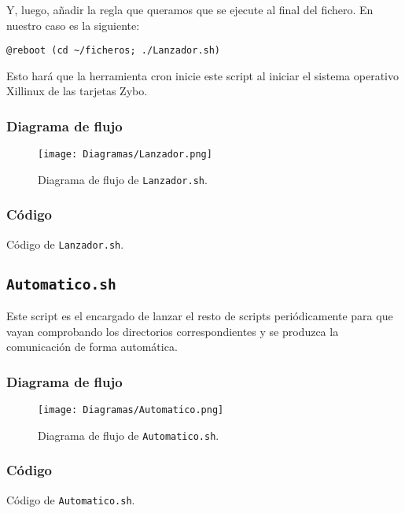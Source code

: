 \documentclass[12pt,letterpaper]{article}
\begin{document}
Y, luego, añadir la regla que queramos que se ejecute al final del fichero. En nuestro caso es la siguiente:
\begin{center}
	\texttt{@reboot (cd \textasciitilde/ficheros; ./Lanzador.sh)}
\end{center}

Esto hará que la herramienta cron inicie este script al iniciar el sistema operativo Xillinux de las tarjetas Zybo.

\newpage
\subsubsection{Diagrama de flujo}
\begin{figure}[h]
	\centering
	\texttt{[image: Diagramas/Lanzador.png]}
	\caption{Diagrama de flujo de \texttt{Lanzador.sh}.}
	\label{Diagrama de flujo de Lanzador.sh}
\end{figure}

\subsubsection{Código}

\begin{center}
	Código de \texttt{Lanzador.sh}.
\end{center}

\subsection{\texttt{Automatico.sh}}
Este script es el encargado de lanzar el resto de scripts periódicamente para que vayan comprobando los directorios correspondientes y se produzca la comunicación de forma automática.

\newpage
\subsubsection{Diagrama de flujo}
\begin{figure}[h]
	\centering
	\texttt{[image: Diagramas/Automatico.png]}
	\caption{Diagrama de flujo de \texttt{Automatico.sh}.}
	\label{Diagrama de flujo de Automatico.sh}
\end{figure}

\subsubsection{Código}

\begin{center}
	Código de \texttt{Automatico.sh}.
\end{center}
\end{document}
